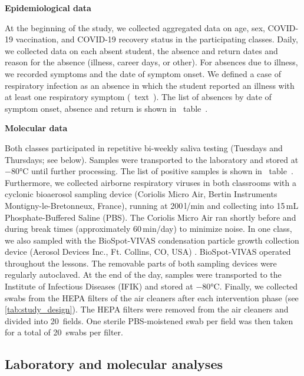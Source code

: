 \documentclass[fleqn,11pt]{wlscirep}
\begin{document}
\noindent\textbf{Epidemiological data} \smallskip

\noindent At the beginning of the study, we collected aggregated data on age, sex, COVID-19 vaccination, and COVID-19 recovery status in the participating classes. Daily, we collected data on each absent student, \ie the absence and return dates and reason for the absence (illness, career days, or other). For absences due to illness, we recorded symptoms and the date of symptom onset. We defined a case of respiratory infection as an absence in which the student reported an illness with at least one respiratory symptom (\supp~text~). The list of absences by date of symptom onset, absence and return is shown in \supp~table~.\medskip

\noindent\textbf{Molecular data} \smallskip

\noindent Both classes participated in repetitive bi-weekly saliva testing (Tuesdays and Thursdays; see  below). Samples were transported to the laboratory and stored at $-$80°C until further processing\cite{Galar2021,To2019,Huber2021}. The list of positive samples is shown in \supp~table~. Furthermore, we collected airborne respiratory viruses in both classrooms with a cyclonic bioaerosol sampling device (Coriolis Micro Air, Bertin Instruments Montigny-le-Bretonneux, France), running at 200\,l/min and collecting into 15\,mL Phosphate-Buffered Saline (PBS). The Coriolis Micro Air ran shortly before and during break times (approximately 60\,min/day) to minimize noise. In one class, we also sampled with the BioSpot-VIVAS condensation particle growth collection device (Aerosol Devices Inc., Ft. Collins, CO, USA) \cite{Pan2016JAM,Lednicky2016AST}. BioSpot-VIVAS operated throughout the lessons. The removable parts of both sampling devices were regularly autoclaved. At the end of the day, samples were transported to the Institute of Infectious Diseases (IFIK) and stored at $-$80°C. Finally, we collected swabs from the HEPA filters of the air cleaners after each intervention phase (see \cref{tab:study_design}). The HEPA filters were removed from the air cleaners and divided into 20~fields. One sterile PBS-moistened swab per field was then taken for a total of 20~swabs per filter. \medskip

\subsection*{Laboratory and molecular analyses}\label{sec:mol_analyses}
\end{document}
